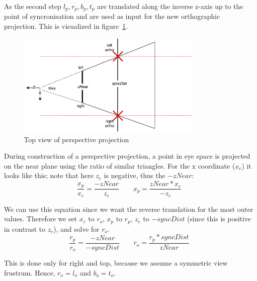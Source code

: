 \documentclass{article}
\begin{document}
As the second step $l_p,r_p,b_p,t_p$ are translated along the inverse z-axis up to the point of syncronisation and are used as input for the new orthographic projection. This is visualized in figure~\ref{fig:projections}.

\begin{figure}[H]
  \centering
  \label{fig:projections}
  \includegraphics[width=0.8\textwidth]{projections}
  \caption{Top view of perspective projection}
\end{figure}

During construction of a perspective projection, a point in eye space is projected on the near plane using the ratio of similar triangles. For the x coordinate ($x_e$) it looks like this; note that here $z_e$ is negative, thus the $-zNear$:
\begin{equation}
    \frac{x_p}{x_e} = \frac{-zNear}{z_e}\qquad
    x_p = \frac{zNear*x_e}{-z_e}
\end{equation}

We can use this equation since we want the reverse translation for the most outer values. Therefore we set $x_e$ to $r_o$, $x_p$ to $r_p$, $z_e$ to $-syncDist$ (since this is positive in contrast to $z_e$), and solve for $r_o$.
\begin{equation}
    \frac{r_p}{r_o} = \frac{-zNear}{-syncDist}\qquad
    r_o = \frac{r_p*syncDist}{zNear}
\end{equation}

This is done only for right and top, because we assume a symmetric view frustrum. Hence, $r_o = l_o$ and $b_o = t_o$.
\end{document}
